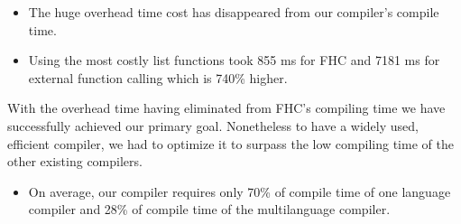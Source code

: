 \documentclass{article}
\begin{document}
\begin{itemize}
	\item The huge overhead time cost has disappeared from our compiler's compile time.
	\item Using the most costly list functions took 855 ms for FHC and 7181 ms for external function calling which is  740\% higher.
\end{itemize}

With the overhead time having eliminated from FHC's compiling time we have successfully achieved our primary goal. Nonetheless to have a widely used, efficient compiler, we had to optimize it to surpass the low compiling time of the other existing compilers.

\begin{center}
\end{center}

\begin{itemize}
	\item On average, our compiler requires only 70\% of compile time of one language compiler and 28\% of compile time of the multilanguage compiler.
\end{itemize}

 

\end{document}
